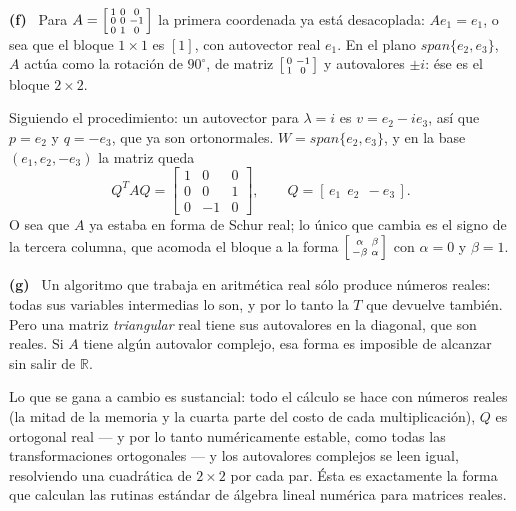 \documentclass[11pt,a4paper]{article}
\newcommand{\bi}[1]{\boldsymbol{#1}}
\newcommand{\n}[1]{\boldsymbol{#1}}
\newcommand{\R}{\mathbb{R}}
\DeclareMathOperator{\gen}{span}
\DeclareMathOperator{\tr}{tr}
\DeclareMathOperator{\rg}{rg}
\def\n#1{#1}\def\bi#1{#1}\def\rg{rg}\def\tr{tr}\def\gen{span}%
\newcommand{\itemsol}[1]{\par\medskip\noindent\textbf{(#1)}\ \ignorespaces}
\begin{document}
\itemsol{f} Para $A=\begin{bsmallmatrix}1&0&0\\0&0&-1\\0&1&0\end{bsmallmatrix}$
la primera coordenada ya está desacoplada: $A\bi{e}_1=\bi{e}_1$, o sea que el
bloque $1\times1$ es $[1]$, con autovector real $\bi{e}_1$. En el plano
$\gen\{\bi{e}_2,\bi{e}_3\}$, $A$ actúa como la rotación de $90^\circ$, de matriz
$\begin{bsmallmatrix}0&-1\\1&0\end{bsmallmatrix}$ y autovalores $\pm i$: ése es
el bloque $2\times2$.

Siguiendo el procedimiento: un autovector para $\lambda=i$ es
$\n v=\bi{e}_2-i\bi{e}_3$, así que $p=\bi{e}_2$ y $q=-\bi{e}_3$, que ya son
ortonormales. $W=\gen\{\bi{e}_2,\bi{e}_3\}$, y en la base
$(\bi{e}_1,\bi{e}_2,-\bi{e}_3)$ la matriz queda
\[
Q^{T}AQ=\begin{bmatrix}1&0&0\\ 0&0&1\\ 0&-1&0\end{bmatrix},
\qquad Q=[\,\bi{e}_1\ \ \bi{e}_2\ \ -\bi{e}_3\,].
\]
O sea que $A$ ya estaba en forma de Schur real; lo único que cambia es el signo
de la tercera columna, que acomoda el bloque a la forma
$\begin{bsmallmatrix}\alpha&\beta\\-\beta&\alpha\end{bsmallmatrix}$ con
$\alpha=0$ y $\beta=1$.

\itemsol{g} Un algoritmo que trabaja en aritmética real sólo produce números
reales: todas sus variables intermedias lo son, y por lo tanto la $T$ que
devuelve también. Pero una matriz \emph{triangular} real tiene sus autovalores en
la diagonal, que son reales. Si $A$ tiene algún autovalor complejo, esa forma es
imposible de alcanzar sin salir de $\R$.

Lo que se gana a cambio es sustancial: todo el cálculo se hace con números reales
(la mitad de la memoria y la cuarta parte del costo de cada multiplicación), $Q$
es ortogonal real --- y por lo tanto numéricamente estable, como todas las
transformaciones ortogonales --- y los autovalores complejos se leen igual,
resolviendo una cuadrática de $2\times2$ por cada par. Ésta es exactamente la
forma que calculan las rutinas estándar de álgebra lineal numérica para matrices
reales.
\end{document}
